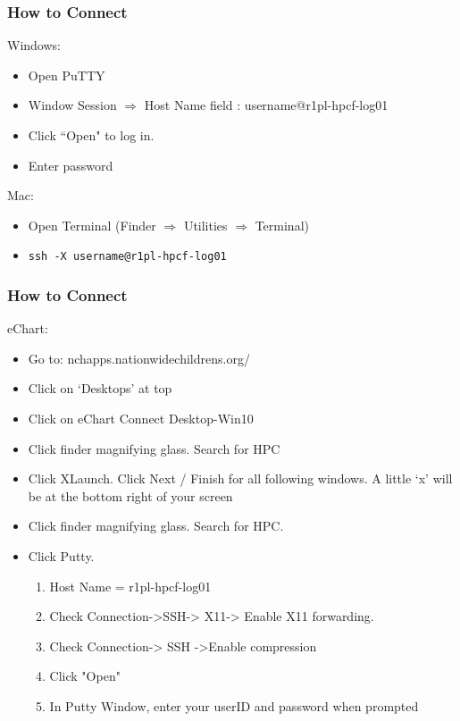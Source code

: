\documentclass{beamer}
\newcommand{\code}[1]{\colorbox{codegray}{\texttt{#1}}}
\begin{document}
\begin{frame}
\frametitle{How to Connect}
Windows:
\begin{itemize}
    \item Open PuTTY
    \item Window Session $\Rightarrow$ Host Name field : username@r1pl-hpcf-log01
    \item Click ``Open" to log in.
    \item Enter password
\end{itemize}

\pause

Mac:
\begin{itemize}
    \item Open Terminal (Finder $\Rightarrow$ Utilities $\Rightarrow$ Terminal)
    \item \code{ssh -X username@r1pl-hpcf-log01}
\end{itemize}
\end{frame}

\begin{frame}
\frametitle{How to Connect}
eChart:
\begin{itemize}
    \item Go to: nchapps.nationwidechildrens.org/
    \pause
    \item Click on ‘Desktops’ at top
    \pause
    \item Click on eChart Connect Desktop-Win10
    \pause
    \item Click finder magnifying glass. Search for HPC
    \pause
    \item Click XLaunch. Click Next / Finish for all following windows.  A little ‘x’ will
          be at the bottom right of your screen
    \pause
    \item Click finder magnifying glass. Search for HPC.
    \pause
    \item Click Putty. 
    \pause
    \begin{enumerate}
        \item Host Name = r1pl-hpcf-log01
        \pause
        \item Check Connection->SSH-> X11-> Enable X11 forwarding. 
        \pause
        \item Check Connection-> SSH ->Enable compression
        \pause
        \item Click "Open"
        \pause
        \item In Putty Window, enter your userID and password when prompted
    \end{enumerate}

\end{itemize}
\end{frame}
\end{document}
